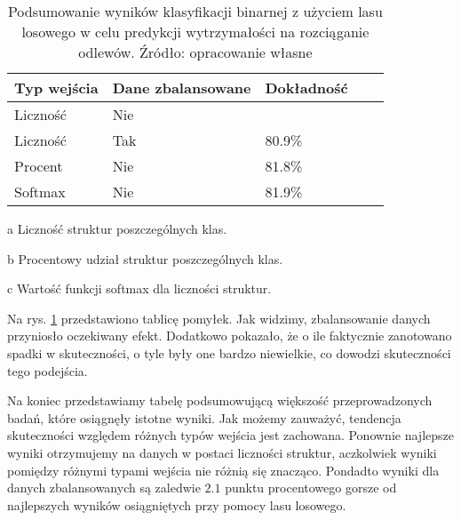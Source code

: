 \begin{table}[!h]
	\centering
	\begin{threeparttable}
		\caption{Podsumowanie wyników klasyfikacji binarnej z użyciem lasu losowego w celu predykcji wytrzymałości na rozciąganie odlewów. Źródło: opracowanie własne}
		\label{rfc.binary.summary.table}
		\begin{tabularx}{1\textwidth}{ |X|X|X|X|X| }
		  \hline
		  \textbf{Typ wejścia} & \textbf{Dane zbalansowane} & \textbf{Dokładność}\\

		  \hline
		  Liczność\tnote{a} & Nie  & \bo{83\%} \\

		  \hline
		  Liczność & Tak & 80.9\%\\

		  \hline
  		  Procent\tnote{b} & Nie & 81.8\%\\

	          \hline
  		  Softmax\tnote{c} & Nie & 81.9\%\\

		  \hline
		\end{tabularx}
		\begin{tablenotes}
			\footnotesize
			\item[a] Liczność struktur poszczególnych klas.
			\item[b] Procentowy udział struktur poszczególnych klas.
			\item[c] Wartość funkcji softmax dla liczności struktur.
		\end{tablenotes}
	\end{threeparttable}
\end{table}
Na rys. \ref{rfc.binary.summary.table} przedstawiono tablicę pomyłek. Jak widzimy, zbalansowanie danych przyniosło oczekiwany efekt. Dodatkowo pokazało, że o ile faktycznie zanotowano spadki w skuteczności, o tyle były one bardzo niewielkie, co dowodzi skuteczności tego podejścia. 

Na koniec przedstawiamy tabelę podsumowującą większość przeprowadzonych badań, które osiągnęły istotne wyniki.
Jak możemy zauważyć, tendencja skuteczności względem różnych typów wejścia jest zachowana. Ponownie najlepsze wyniki otrzymujemy na danych w postaci liczności struktur, aczkolwiek wyniki pomiędzy różnymi typami wejścia nie różnią się znacząco. Pondadto wyniki dla danych zbalansowanych są zaledwie $2.1$ punktu procentowego gorsze od najlepszych wyników osiągniętych przy pomocy lasu losowego. 


